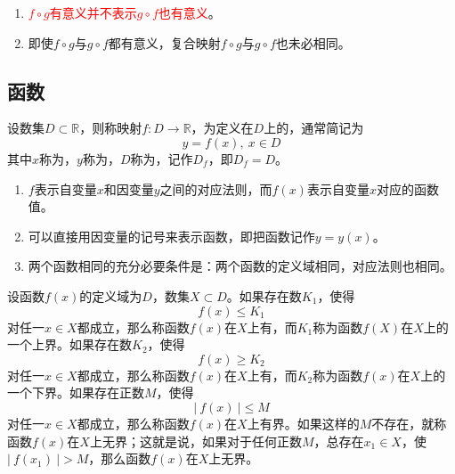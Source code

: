 \documentclass[lang=cn,10pt]{elegantbook}
\newcommand{\R}{\mathbb{R}}
\begin{document}
\begin{note}
	\begin{enumerate}
		\item \textcolor{red}{\( f \circ g \)有意义并不表示\( g \circ f \)也有意义}。
		\item \heiti 即使\( f \circ g \)与\( g \circ f \)都有意义，复合映射\( f \circ g \)与\( g \circ f \)也未必相同。
	\end{enumerate}
\end{note}

\subsection{函数}
\begin{definition}[函数的概念]
	设数集\( D \subset \R \)，则称映射\( f:D \rightarrow \R \)，为定义在\( D \)上的，通常简记为
	\[ y = f(x),\ x \in D \]
	其中\( x \)称为，\( y \)称为，\( D \)称为，记作\( D_{f} \)，即\( D_{f} = D \)。
\end{definition}

\begin{note}
	\begin{enumerate}
		\item \( f \)表示自变量\( x \)和因变量\( y \)之间的对应法则，而\( f(x) \)表示自变量\( x \)对应的函数值。
		\item 可以直接用因变量的记号来表示函数，即把函数记作\( y = y(x) \)。
		\item 两个函数相同的{\heiti 充分必要条件}是：两个函数的{\heiti 定义域}相同，{\heiti 对应法则}也相同。
	\end{enumerate}
\end{note}

\begin{definition}[函数的有界性]
	设函数\( f(x) \)的定义域为\( D \)，数集\( X \subset D \)。如果存在数\( K_{1} \)，使得
	\[ f(x) \leqslant K_{1} \]
	对任一\( x \in X \)都成立，那么称函数\( f(x) \)在\( X \)上有，而\( K_{1} \)称为函数\( f(X) \)在\( X \)上的一个上界。如果存在数\( K_{2} \)，使得
	\[ f(x) \geqslant K_{2} \]
	对任一\( x \in X \)都成立，那么称函数\( f(x) \)在\( X \)上有，而\( K_{2} \)称为函数\( f(x) \)在\( X \)上的一个下界。如果存在正数\( M \)，使得
	\[ |\ f(x)\ | \leqslant M \]
	对任一\( x \in X \)都成立，那么称函数\( f(x) \)在\( X \)上有界。如果这样的\( M \)不存在，就称函数\( f(x) \)在\( X \)上无界；这就是说，如果对于任何正数\( M \)，总存在\( x_{1} \in X \)，使\( |\ f(x_{1})\ | > M \)，那么函数\( f(x) \)在\( X \)上无界。
\end{definition}
\end{document}
